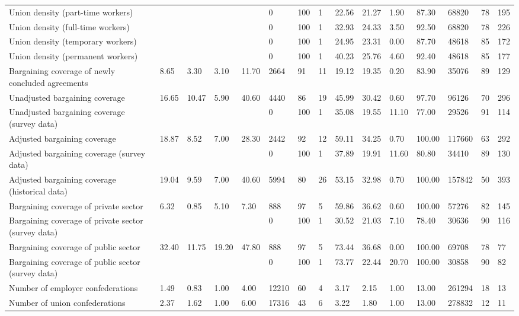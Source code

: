 \begin{longtable}{lllllllllllllll}
Union density (part-time workers) &  &  &  &  & 0 & 100 & 1 & 22.56 & 21.27 & 1.90 & 87.30 & 68820 & 78 & 195\\
Union density (full-time workers) &  &  &  &  & 0 & 100 & 1 & 32.93 & 24.33 & 3.50 & 92.50 & 68820 & 78 & 226\\
Union density (temporary workers) &  &  &  &  & 0 & 100 & 1 & 24.95 & 23.31 & 0.00 & 87.70 & 48618 & 85 & 172\\
Union density (permanent workers) &  &  &  &  & 0 & 100 & 1 & 40.23 & 25.76 & 4.60 & 92.40 & 48618 & 85 & 177\\
\addlinespace
Bargaining coverage of newly concluded agreements & 8.65 & 3.30 & 3.10 & 11.70 & 2664 & 91 & 11 & 19.12 & 19.35 & 0.20 & 83.90 & 35076 & 89 & 129\\
Unadjusted bargaining coverage & 16.65 & 10.47 & 5.90 & 40.60 & 4440 & 86 & 19 & 45.99 & 30.42 & 0.60 & 97.70 & 96126 & 70 & 296\\
Unadjusted bargaining coverage (survey data) &  &  &  &  & 0 & 100 & 1 & 35.08 & 19.55 & 11.10 & 77.00 & 29526 & 91 & 114\\
Adjusted bargaining coverage & 18.87 & 8.52 & 7.00 & 28.30 & 2442 & 92 & 12 & 59.11 & 34.25 & 0.70 & 100.00 & 117660 & 63 & 292\\
Adjusted bargaining coverage (survey data) &  &  &  &  & 0 & 100 & 1 & 37.89 & 19.91 & 11.60 & 80.80 & 34410 & 89 & 130\\
\addlinespace
Adjusted bargaining coverage (historical data) & 19.04 & 9.59 & 7.00 & 40.60 & 5994 & 80 & 26 & 53.15 & 32.98 & 0.70 & 100.00 & 157842 & 50 & 393\\
Bargaining coverage of private sector & 6.32 & 0.85 & 5.10 & 7.30 & 888 & 97 & 5 & 59.86 & 36.62 & 0.60 & 100.00 & 57276 & 82 & 145\\
Bargaining coverage of private sector (survey data) &  &  &  &  & 0 & 100 & 1 & 30.52 & 21.03 & 7.10 & 78.40 & 30636 & 90 & 116\\
Bargaining coverage of public sector & 32.40 & 11.75 & 19.20 & 47.80 & 888 & 97 & 5 & 73.44 & 36.68 & 0.00 & 100.00 & 69708 & 78 & 77\\
Bargaining coverage of public sector (survey data) &  &  &  &  & 0 & 100 & 1 & 73.77 & 22.44 & 20.70 & 100.00 & 30858 & 90 & 82\\
\addlinespace
Number of employer confederations & 1.49 & 0.83 & 1.00 & 4.00 & 12210 & 60 & 4 & 3.17 & 2.15 & 1.00 & 13.00 & 261294 & 18 & 13\\
Number of union confederations & 2.37 & 1.62 & 1.00 & 6.00 & 17316 & 43 & 6 & 3.22 & 1.80 & 1.00 & 13.00 & 278832 & 12 & 11\\

\end{longtable}
